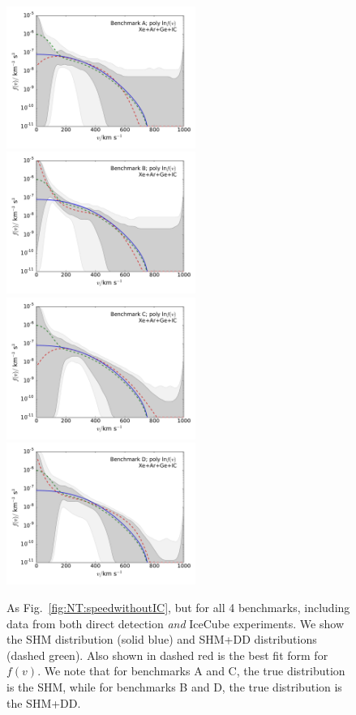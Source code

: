 \begin{figure}[!pht]
  \centering
  \includegraphics[trim=0.5cm 0.5cm 0.5cm 0.5cm, clip,width=0.55\textwidth]{NT/BenchmarkA_poly-speed.pdf}
  \includegraphics[trim=0.5cm 0.5cm 0.5cm 0.5cm, clip,width=0.55\textwidth]{NT/BenchmarkB_poly-speed.pdf}
  \includegraphics[trim=0.5cm 0.5cm 0.5cm 0.5cm, clip,width=0.55\textwidth]{NT/BenchmarkC_poly-speed.pdf}
  \includegraphics[trim=0.5cm 0.5cm 0.5cm 0.5cm, clip,width=0.55\textwidth]{NT/BenchmarkD_poly-speed.pdf}
\caption[As Fig.~\ref{fig:NT:speedwithoutIC} using IceCube data for all 4 benchmarks]{As Fig.~\ref{fig:NT:speedwithoutIC}, but for all 4 benchmarks, including data from both direct detection \textit{and} IceCube experiments. We show the SHM distribution (solid blue) and SHM+DD distributions (dashed green). Also shown in dashed red is the best fit form for $f(v)$. We note that for benchmarks A and C, the true distribution is the SHM, while for benchmarks B and D, the true distribution is the SHM+DD.}
\label{fig:NT:speedwithIC}
\end{figure}

